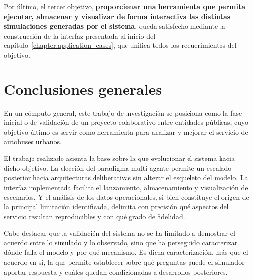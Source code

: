 Por último, el tercer objetivo, \textbf{proporcionar una herramienta que permita ejecutar, almacenar y visualizar de forma
interactiva las distintas simulaciones generadas por el sistema}, queda satisfecho mediante la construcción de la interfaz presentada
al inicio del capítulo~\ref{chapter:application_cases}, que unifica todos los requerimientos del objetivo.

\section{Conclusiones generales}
En un cómputo general, este trabajo de investigación se posiciona como la fase inicial o de validación de un proyecto colaborativo
entre entidades públicas, cuyo objetivo último es servir como herramienta para analizar y mejorar el servicio de autobuses 
urbanos.

El trabajo realizado asienta la base sobre la que evolucionar el sistema hacia dicho
objetivo. La elección del paradigma multi-agente permite un escalado posterior hacia
arquitecturas deliberativas sin alterar el esqueleto del modelo. La interfaz implementada
facilita el lanzamiento, almacenamiento y visualización de escenarios. Y el análisis de los
datos operacionales, si bien constituye el origen de la principal limitación identificada,
delimita con precisión qué aspectos del servicio resultan reproducibles y con qué grado de
fidelidad.

Cabe destacar que la validación del sistema no se ha limitado a demostrar el acuerdo entre
lo simulado y lo observado, sino que ha perseguido caracterizar dónde falla el modelo y por
qué mecanismo. Es dicha caracterización, más que el acuerdo en sí, la que permite establecer
sobre qué preguntas puede el simulador aportar respuesta y cuáles quedan condicionadas a
desarrollos posteriores.
